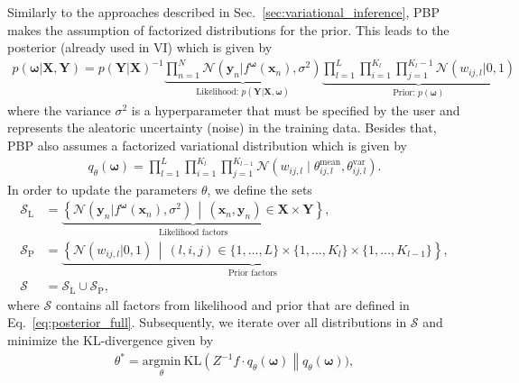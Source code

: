\documentclass[runningheads]{llncs}
\begin{document}
Similarly to the approaches described in Sec.~\ref{sec:variational_inference}, PBP makes the assumption of factorized distributions for the prior.
This leads to the posterior (already used in VI) which is given by
\begin{align}
    p(\boldsymbol{\omega} | \mathbf{X}, \mathbf{Y}) =
    p(\mathbf{Y} |\mathbf{X})^{-1}
    \underbrace{\prod_{n=1}^{N} \mathcal{N}\left( \mathbf{y}_n | f^{\boldsymbol{\omega}}\left( \mathbf{x}_n \right), \sigma^2 \right)}_{\text{Likelihood: } p(\mathbf{Y} | \mathbf{X}, \boldsymbol{\omega})}
    \underbrace{ \prod_{l=1}^{L} \prod_{i=1}^{K_l} \prod_{j=1}^{K_l-1}\mathcal{N}\left( w_{ij,l} | 0, 1\right)}_{\text{Prior: }p(\boldsymbol{\omega})} \label{eq:posterior_full}
\end{align}
where the variance $\sigma^2$ is a hyperparameter that must be specified by the user and represents the aleatoric uncertainty (noise) in the training data.
Besides that, PBP also assumes a factorized variational distribution which is given by
\begin{align}
    q_\theta\left(\boldsymbol{\omega}\right) = \prod_{l=1}^{L}\prod_{i=1}^{K_l}\prod_{j=1}^{K_{l-1}} \mathcal{N}\left( w_{ij,l} \mid \theta^\mathrm{mean}_{ij,l}, \theta^\mathrm{var}_{ij,l}\right)\label{eq:variational_factorized_bpb}.
\end{align}
In order to update the parameters $\theta$, we define the sets
\begin{align}
    \mathcal{S}_{\mathrm{L}} &= \underbrace{\left\{ \mathcal{N}\left( \mathbf{y}_n | f^{\boldsymbol{\omega}}\left( \mathbf{x}_n \right), \sigma^2 \right) \,\middle|\, (\mathbf{x}_n, \mathbf{y}_n) \in \mathbf{X} \times \mathbf{Y}\right\}}_{\text{Likelihood factors}},\\
    \mathcal{S}_{\mathrm{P}} &= \underbrace{\left\{ \mathcal{N}\left( w_{ij,l}|0, 1\right) \,\middle|\,(l, i, j) \in \{1, \dots, L\}\times \{1, \dots, K_l\}\times \{1, \dots, K_{l-1}\}  \right\}}_{\text{Prior factors}},\\
    \mathcal{S} &= \mathcal{S}_{\mathrm{L}} \cup \mathcal{S}_{\mathrm{P}},
\end{align}
where $\mathcal{S}$ contains all factors from likelihood and prior that are defined in Eq.~\ref{eq:posterior_full}.
Subsequently, we iterate over all distributions in $\mathcal{S}$ and minimize the KL-divergence given by
\begin{align}
    \theta^* = \underset{\theta}{\mathrm{argmin}}\  \mathrm{KL}\left(Z^{-1}f\cdot q_\theta(\boldsymbol{\omega})\right \| q_\theta(\boldsymbol{\omega})),
\end{align}
\end{document}

